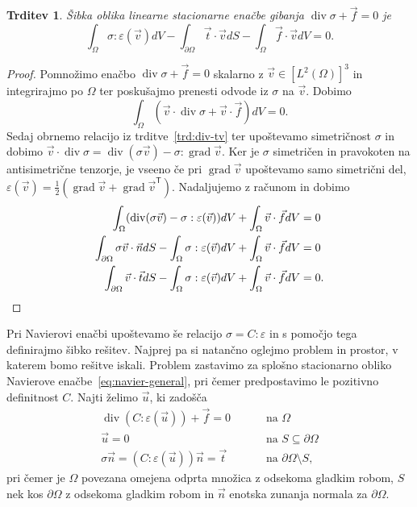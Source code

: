 \documentclass[12pt,a4paper,twoside]{article}
\theoremstyle{definition} %
\theoremstyle{plain} %
\newtheorem{trditev}[definicija]{Trditev}
\numberwithin{equation}{section}
\newcommand{\T}{\mathsf{T}}
\renewcommand{\div}{\operatorname{div}}
\newcommand{\grad}{\operatorname{grad}}
\newcommand{\eps}{\varepsilon}
\newcommand{\vv}{\vec{v}}
\newcommand{\vt}{\vec{t}}
\newcommand{\vu}{\vec{u}}
\newcommand{\vn}{\vec{n}}
\newcommand{\vf}{\vec{f}}
\newcommand{\ts}{\sigma}
\begin{document}
\begin{trditev}
  Šibka oblika linearne stacionarne enačbe gibanja $\div \ts + \vf = 0$ je
  \begin{equation}
  \int_{\Omega}\ts : \eps(\vv) dV - \int_{\partial \Omega} \vt\cdot \vv dS -
    \int_{\Omega} \vf\cdot \vv dV = 0.
    \label{eq:cauchy-sibka}
  \end{equation}
\end{trditev}
\begin{proof}
Pomnožimo enačbo $\div\ts + \vf = 0$ skalarno z $\vv \in [L^2(\Omega)]^3$ in integrirajmo po
$\Omega$ ter poskušajmo prenesti odvode iz $\ts$ na $\vv$. Dobimo
\[
  \int_{\Omega}(\vv\cdot\div \ts + \vv\cdot\vf)dV = 0.
\]
Sedaj obrnemo relacijo iz trditve~\ref{trd:div-tv} ter upoštevamo simetričnost
$\ts$ in dobimo $\vv\cdot\div\ts = \div(\sigma \vv) - \sigma:\grad \vv$.
Ker je $\ts$ simetričen in pravokoten na antisimetrične tenzorje, je vseeno če
pri $\grad\vv$ upoštevamo samo simetrični del, $\eps(\vv) =
\frac12(\grad\vv+\grad\vv^\T)$. Nadaljujemo z računom in dobimo
\begin{align*}
\int_{\Omega}(\div(\sigma \vv) - \ts:\eps(\vv)) dV + \int_{\Omega} \vv\cdot\vf dV &= 0 \\
\int_{\partial \Omega}\sigma \vv \cdot \vn dS - \int_\Omega\ts:\eps(\vv) dV +
\int_{\Omega} \vv\cdot\vf dV &= 0 \\
\int_{\partial \Omega}\vv \cdot \vt dS - \int_\Omega\ts:\eps(\vv) dV +
\int_{\Omega} \vv\cdot\vf dV &= 0. \qedhere
\end{align*}
\end{proof}
Pri Navierovi enačbi upoštevamo še relacijo $\ts = C:\eps$ in s pomočjo tega definirajmo šibko
rešitev. Najprej pa si natančno oglejmo problem in prostor, v katerem bomo rešitve iskali. Problem
zastavimo za splošno stacionarno obliko Navierove enačbe~\eqref{eq:navier-general}, pri čemer
predpostavimo le pozitivno definitnost $C$. Najti želimo $\vu$, ki zadošča
\begin{align}
  \div(C:\eps(\vu)) + \vf = 0 &\qquad \text{ na } \Omega
  \nonumber \\
  \vu = 0 &\qquad \text{ na } S \subseteq \partial\Omega \label{eq:navier-general-problem} \\
  \ts\vn = (C:\eps(\vu))\vn = \vt &\qquad \text{ na } \partial\Omega \setminus
  S, \nonumber
\end{align}
pri čemer je $\Omega$ povezana omejena odprta množica z odsekoma gladkim robom,
$S$ nek kos $\partial\Omega$ z odsekoma gladkim robom in $\vn$
enotska zunanja normala za $\partial\Omega$.
\end{document}
